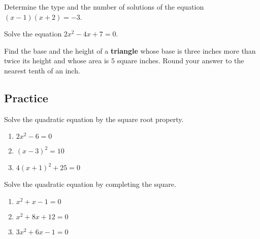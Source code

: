 \begin{example}

Determine the type and the number of solutions of the equation
\((x-1)(x+2)=-3\).

\end{example}
\vspace*{5\baselineskip}

\begin{example}

Solve the equation \(2x^2-4x+7=0\).

\end{example}
\vspace*{5\baselineskip}

\begin{example}

Find the base and the height of a \textbf{triangle} whose base is three
inches more than twice its height and whose area is \(5\) square inches.
Round your answer to the nearest tenth of an inch.

\end{example}
\vspace*{5\baselineskip}

\hypertarget{practice}{%
\subsection{Practice}\label{practice}}

\begin{exercise}

Solve the quadratic equation by the square root property.

\begin{enumerate}
\item
  \(2x^2-6=0\)
\item
  \((x-3)^2=10\)
\item
  \(4(x+1)^2+25=0\)
\end{enumerate}

\end{exercise}

\begin{exercise}

Solve the quadratic equation by completing the square.

\begin{enumerate}
\item
  \(x^2+x-1=0\)
\item
  \(x^2+8x+12=0\)
\item
  \(3x^2+6x-1=0\)
\end{enumerate}

\end{exercise}

